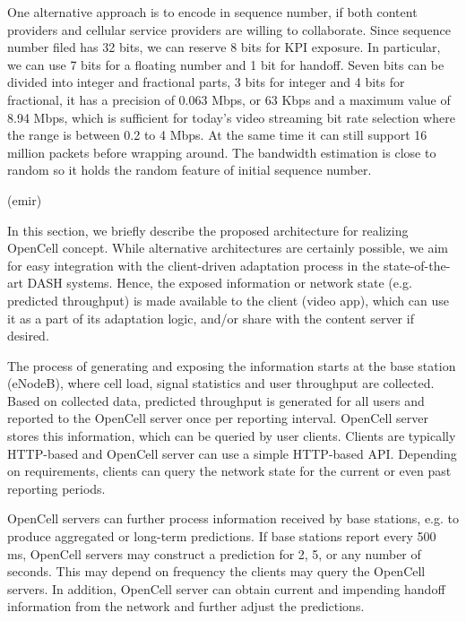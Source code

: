 One alternative approach is to encode in sequence number, if both content providers and cellular service providers are willing to collaborate. Since sequence number filed has 32 bits, we can reserve 8 bits for KPI exposure. In particular, we can use 7 bits for a floating number and 1 bit for handoff. Seven bits can be divided into integer and fractional parts, 3 bits for integer and 4 bits for fractional, it has a precision of 0.063 Mbps, or 63 Kbps and a maximum value of 8.94 Mbps, which is sufficient for today's video streaming bit rate selection where the range is between 0.2 to 4 Mbps.
At the same time it can still support 16 million packets before wrapping around. The bandwidth estimation is close to random so it holds the random feature of initial sequence number.



(emir)

In this section, we briefly describe the proposed architecture for realizing OpenCell concept. While alternative architectures are certainly possible, we aim for easy integration with the client-driven adaptation process in the state-of-the-art DASH systems. Hence, the exposed information or network state (e.g. predicted throughput) is made available to the client (video app), which can use it as a part of its adaptation logic, and/or share with the content server if desired.

The process of generating and exposing the information starts at the base station (eNodeB), where cell load, signal statistics and user throughput are collected. Based on collected data, predicted throughput is generated for all users and reported to the OpenCell server once per reporting interval. OpenCell server stores this information, which can be queried by user clients. Clients are typically HTTP-based and OpenCell server can use a simple HTTP-based API. Depending on requirements, clients can query the network state for the current or even past reporting periods. 

OpenCell servers can further process information received by base stations, e.g. to produce aggregated or long-term predictions. If base stations report every 500 ms, OpenCell servers may construct a prediction for 2, 5, or any number of seconds. This may depend on frequency the clients may query the OpenCell servers. In addition, OpenCell server can obtain current and impending handoff information from the network and further adjust the predictions.


